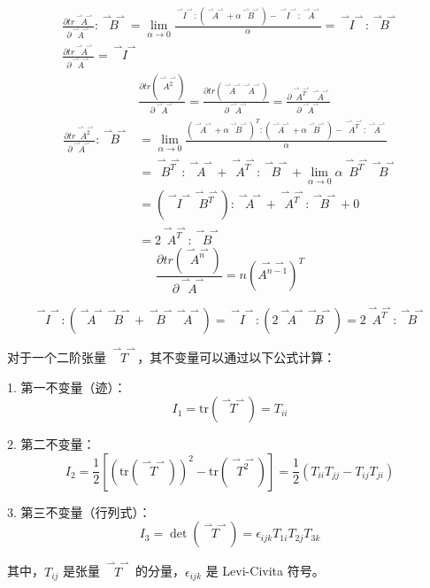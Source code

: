 \documentclass[12pt, a4paper, oneside, UTF8]{ctexbook}  %
\newcommand{\pa}{\partial}
\newcommand{\vvec}{\overset{\rightharpoonup\!\!\!\! \rightharpoonup}}
\begin{document}
\begin{example}
    \begin{gather*}
        \frac{\pa tr\vvec{A}}{\pa\vvec{A}}:\vvec{B}
        =\lim_{\alpha\rightarrow0}\frac{\vvec{I}:\left(\vvec{A}+\alpha\vvec{B}\right)
        -\vvec{I}:\vvec{A}}{\alpha}=\vvec{I}:\vvec{B}\\
        \frac{\pa tr\vvec{A}}{\pa\vvec{A}}=\vvec{I}
    \end{gather*}
    \begin{align*}        
        &\frac{\pa tr\left(\vvec{A^2}\right)}{\pa\vvec{A}}
        =\frac{\pa tr\left(\vvec{A}\vvec{A}\right)}{\pa\vvec{A}}
        =\frac{\pa \vvec{A^T}\vvec{A}}{\pa\vvec{A}}\\
        \frac{\pa tr\vvec{A^2}}{\pa\vvec{A}}:\vvec{B}
        &=\lim_{\alpha\rightarrow0}\frac{\left(\vvec{A}+\alpha\vvec{B}\right)^T:
        \left(\vvec{A}+\alpha\vvec{B}\right)-\vvec{A^T}:\vvec{A}}{\alpha}\\
        &=\vvec{B^T}:\vvec{A}+\vvec{A^T}:\vvec{B}
        +\lim_{\alpha\rightarrow0}\alpha\vvec{B^T}\vvec{B}\\
        &=\left(\vvec{I}\vvec{B^T}\right):\vvec{A}
        +\vvec{A^T}:\vvec{B}+0\\
        &=2\vvec{A^T}:\vvec{B}        
    \end{align*}
    \[\frac{\pa tr\left(\vvec{A^n}\right)}{\pa\vvec{A}}
    =n\left(\vvec{A^{n-1}}\right)^T\]
\end{example}
\begin{example}
    \[
    \vvec{I}:\left(\vvec{A}\vvec{B}+\vvec{B}\vvec{A}\right)
    =\vvec{I}:\left(2\vvec{A}\vvec{B}\right)
    =2\vvec{A^T}:\vvec{B}
    \]
\end{example}
\begin{add}    
    对于一个二阶张量 \( \vvec{T} \)，其不变量可以通过以下公式计算：
    
    1. 第一不变量（迹）：
    \[
    I_1 = \text{tr}(\vvec{T}) = T_{ii}
    \]
    
    2. 第二不变量：
    \[
    I_2 = \frac{1}{2} \left[ (\text{tr}(\vvec{T}))^2 - \text{tr}(\vvec{T^2}) \right] = \frac{1}{2} \left( T_{ii} T_{jj} - T_{ij} T_{ji} \right)
    \]
    
    3. 第三不变量（行列式）：
    \[
    I_3 = \det(\vvec{T}) = \epsilon_{ijk} T_{1i} T_{2j} T_{3k}
    \]
    
    其中，\( T_{ij} \) 是张量 \( \vvec{T} \) 的分量，\( \epsilon_{ijk} \) 是 Levi-Civita 符号。
\end{add}
\end{document}

